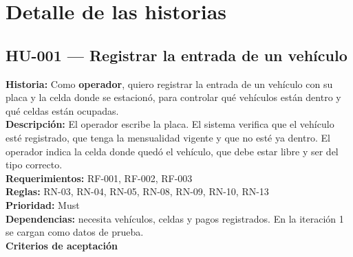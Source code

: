 \section{Detalle de las historias}
\subsection{HU-001 — Registrar la entrada de un vehículo}
\textbf{Historia:} Como \textbf{operador}, quiero registrar la entrada de un vehículo con su placa y la celda donde se estacionó, para controlar qué vehículos están dentro y qué celdas están ocupadas.\\
\textbf{Descripción:} El operador escribe la placa. El sistema verifica que el vehículo esté registrado, que tenga la mensualidad vigente y que no esté ya dentro. El operador indica la celda donde quedó el vehículo, que debe estar libre y ser del tipo correcto.\\
\textbf{Requerimientos:} RF-001, RF-002, RF-003\\
\textbf{Reglas:} RN-03, RN-04, RN-05, RN-08, RN-09, RN-10, RN-13\\
\textbf{Prioridad:} Must\\
\textbf{Dependencias:} necesita vehículos, celdas y pagos registrados. En la iteración 1 se cargan como datos de prueba.\\
\textbf{Criterios de aceptación}

